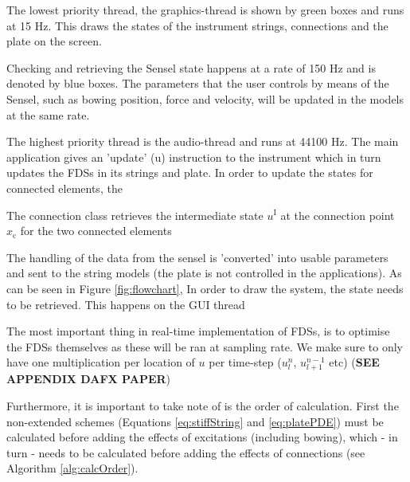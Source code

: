 \documentclass{article}
\begin{document}
The lowest priority thread, the graphics-thread is shown by green boxes and runs at 15 Hz. This draws the states of the instrument strings, connections and the plate on the screen.

Checking and retrieving the Sensel state happens at a rate of 150 Hz and is denoted by blue boxes. The parameters that the user controls by means of the Sensel, such as bowing position, force and velocity, will be updated in the models at the same rate. 

The highest priority thread is the audio-thread and runs at 44100 Hz. The main application gives an 'update' (u) instruction to the instrument which in turn updates the FDSs in its strings and plate. In order to update the states for connected elements, the 

The connection class retrieves the intermediate state $u^\text{I}$ at the connection point $x_\text{c}$ for the two connected elements 

The handling of the data from the sensel is 'converted' into usable parameters and sent to the string models (the plate is not controlled in the applications).
As can be seen in Figure \ref{fig:flowchart}, In order to draw the system, the state needs to be retrieved. This happens on the GUI thread


The most important thing in real-time implementation of FDSs, is to optimise the FDSs themselves as these will be ran at sampling rate. We make sure to only have one multiplication per location of $u$ per time-step ($u_l^n$, $u_{l+1}^{n-1}$ etc) (\textbf{SEE APPENDIX DAFX PAPER}) %

Furthermore, it is important to take note of is the order of calculation. First the non-extended schemes (Equations \eqref{eq:stiffString} and \eqref{eq:platePDE}) must be calculated before adding the effects of excitations (including bowing), which - in turn - needs to be calculated before adding the effects of connections (see Algorithm \ref{alg:calcOrder}).
\end{document}
